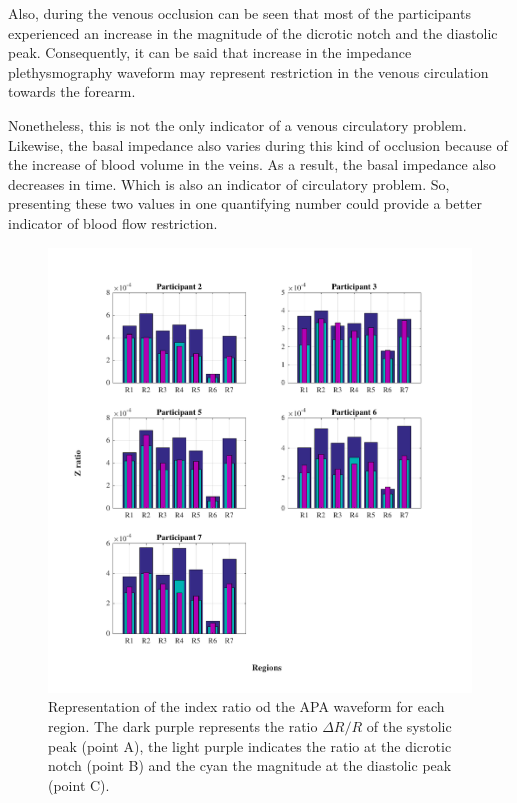 Also, during the venous occlusion can be seen that most of the participants experienced an increase in the magnitude of the dicrotic notch and the diastolic peak. Consequently, it can be said that increase in the impedance plethysmography waveform may represent restriction in the venous circulation towards the forearm. 

Nonetheless, this is not the only indicator of a venous circulatory problem. Likewise, the basal impedance also varies during this kind of occlusion because of the increase of blood volume in the veins. As a result, the basal impedance also decreases in time. Which is also an indicator of circulatory problem. So, presenting these two values in one quantifying number could provide a better indicator of blood flow restriction. 

\begin{figure}[!htpb]
	\includegraphics[width=1\textwidth,keepaspectratio]{figure_apa_9}    
	\caption[Bland and Altman plot of the relation between LDF and iPG]{Representation of the index ratio od the APA waveform for each region. The dark purple represents the ratio $\Delta R/ R$ of the systolic peak (point A), the light purple indicates the ratio at the dicrotic notch (point B) and the cyan the magnitude at the diastolic peak (point C).}
	\label{fig:ration Z bar}
\end{figure}

